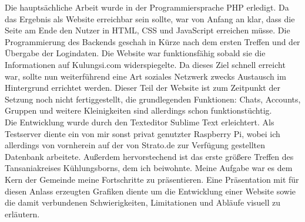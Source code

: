 Die hauptsächliche Arbeit wurde in der Programmiersprache PHP erledigt.
Da das Ergebnis als Website erreichbar sein sollte,
war von Anfang an klar, dass die Seite am Ende den Nutzer in HTML, CSS und JavaScript
erreichen müsse.
Die Programmierung des Backends geschah in Kürze nach dem ersten Treffen und der Übergabe der Logindaten.
Die Website war funktionsfähig sobald sie die Informationen auf Kulungsi.com widerspiegelte.
Da dieses Ziel schnell erreicht war, sollte nun weiterführend eine Art soziales Netzwerk zwecks Austausch im Hintergrund errichtet werden.
Dieser Teil der Website ist zum Zeitpunkt der Setzung noch nicht fertiggestellt, die grundlegenden
Funktionen: Chats, Accounts, Gruppen und weitere Kleinigkeiten sind allerdings schon funktionstüchtig.\\
Die Entwicklung wurde durch den Texteditor Sublime Text erleichtert. Als Testserver diente ein von mir sonst privat genutzter Raspberry Pi,
wobei ich allerdings von vornherein auf der von Strato.de zur Verfügung gestellten Datenbank arbeitete.
Außerdem hervorstechend ist das erste größere Treffen des Tansaniakreises Kühlungsborns, dem ich beiwohnte.
Meine Aufgabe war es dem Kern der Gemeinde meine Fortschritte zu präsentieren.
Eine Präsentation mit für diesen Anlass erzeugten Grafiken diente um die Entwicklung einer Website
sowie die damit verbundenen Schwierigkeiten, Limitationen und Abläufe visuell zu erläutern.



